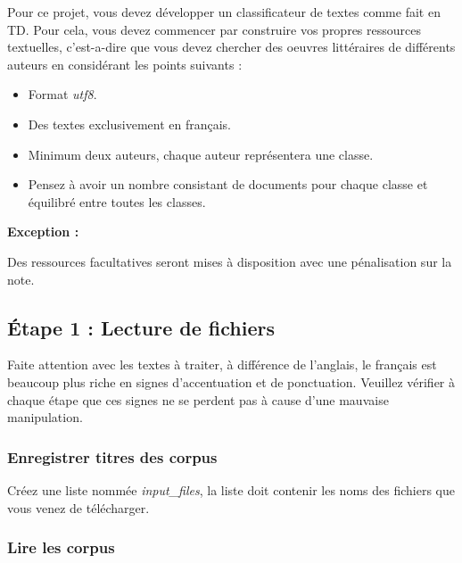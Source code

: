 \vspace{0.5cm}
 Pour ce projet, vous devez développer un classificateur de textes comme fait en TD. Pour cela, vous devez commencer par construire vos propres ressources textuelles, c'est-a-dire que vous devez chercher des oeuvres littéraires de différents auteurs en considérant les points suivants :

\begin{itemize}
	\item Format \textit{utf8}.
	\item Des textes exclusivement en français.
	\item Minimum deux auteurs, chaque auteur représentera une classe.
	\item Pensez à avoir un nombre consistant de documents pour chaque classe et équilibré entre toutes les classes.
\end{itemize}

\textbf{Exception : }

Des ressources facultatives seront mises à disposition avec une pénalisation sur la note.

\vspace{0.5cm}

\subsection{Étape 1 : Lecture de fichiers}

Faite attention avec les textes à traiter, à différence de l'anglais, le français est beaucoup plus riche en signes d'accentuation et de ponctuation. Veuillez vérifier à chaque étape que ces signes ne se perdent pas à cause d'une mauvaise manipulation.

\subsubsection{Enregistrer titres des corpus}

Créez une liste nommée \textit{input\_files}, la liste doit contenir les noms des fichiers que vous venez de télécharger.

\subsubsection{Lire les corpus}

